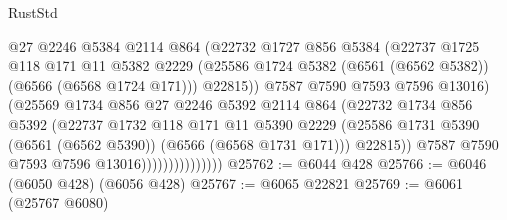 \begin{lexlean}{RustStd}
\begin{coremodule}
{\begin{coremodule}
{{{{{{{{{{{{{{{{{{{{{{{{{{                                  @27
                                  @2246
                                  @5384
                                  @2114
                                  @864
                                  (@22732
                                    @1727
                                    @856
                                    @5384
                                    (@22737
                                      @1725
                                      @118
                                      @171
                                      @11
                                      @5382
                                      @2229
                                      (@25586
                                        @1724
                                        @5382
                                        (@6561 (@6562 @5382))
                                        (@6566 (@6568 @1724 @171)))
                                      @22815))
                                  @7587
                                  @7590
                                  @7593
                                  @7596
                                  @13016)
                                (@25569
                                  @1734
                                  @856
                                  @27
                                  @2246
                                  @5392
                                  @2114
                                  @864
                                  (@22732
                                    @1734
                                    @856
                                    @5392
                                    (@22737
                                      @1732
                                      @118
                                      @171
                                      @11
                                      @5390
                                      @2229
                                      (@25586
                                        @1731
                                        @5390
                                        (@6561 (@6562 @5390))
                                        (@6566 (@6568 @1731 @171)))
                                      @22815))
                                  @7587
                                  @7590
                                  @7593
                                  @7596
                                  @13016)))))))))))))))
@25762 := @6044 @428
@25766 := @6046 (@6050 @428) (@6056 @428)
@25767 := @6065 @22821
@25769 := @6061 (@25767 @6080)
}}}}}}}}}}}}}}}}}}}}}}}}}}
\end{coremodule}}
\end{coremodule}
\end{lexlean}
